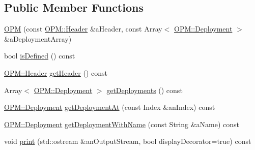 \subsection*{Public Member Functions}
\begin{DoxyCompactItemize}
\item 
\hyperlink{classostk_1_1astro_1_1trajectory_1_1orbit_1_1messages_1_1spacex_1_1_o_p_m_a2c7d8dad60a7cabf0a3a24bae0972a89}{O\+PM} (const \hyperlink{structostk_1_1astro_1_1trajectory_1_1orbit_1_1messages_1_1spacex_1_1_o_p_m_1_1_header}{O\+P\+M\+::\+Header} \&a\+Header, const Array$<$ \hyperlink{structostk_1_1astro_1_1trajectory_1_1orbit_1_1messages_1_1spacex_1_1_o_p_m_1_1_deployment}{O\+P\+M\+::\+Deployment} $>$ \&a\+Deployment\+Array)
\item 
bool \hyperlink{classostk_1_1astro_1_1trajectory_1_1orbit_1_1messages_1_1spacex_1_1_o_p_m_ac3351273b45e39ef7574a5cb9b7bf30d}{is\+Defined} () const
\item 
\hyperlink{structostk_1_1astro_1_1trajectory_1_1orbit_1_1messages_1_1spacex_1_1_o_p_m_1_1_header}{O\+P\+M\+::\+Header} \hyperlink{classostk_1_1astro_1_1trajectory_1_1orbit_1_1messages_1_1spacex_1_1_o_p_m_ae0474132f01725d4b6e1276e52b9eb21}{get\+Header} () const
\item 
Array$<$ \hyperlink{structostk_1_1astro_1_1trajectory_1_1orbit_1_1messages_1_1spacex_1_1_o_p_m_1_1_deployment}{O\+P\+M\+::\+Deployment} $>$ \hyperlink{classostk_1_1astro_1_1trajectory_1_1orbit_1_1messages_1_1spacex_1_1_o_p_m_a61911a7200fc4b6c6b82224b3f8f07b6}{get\+Deployments} () const
\item 
\hyperlink{structostk_1_1astro_1_1trajectory_1_1orbit_1_1messages_1_1spacex_1_1_o_p_m_1_1_deployment}{O\+P\+M\+::\+Deployment} \hyperlink{classostk_1_1astro_1_1trajectory_1_1orbit_1_1messages_1_1spacex_1_1_o_p_m_a175c99608626161b9fccba5b82c55416}{get\+Deployment\+At} (const Index \&an\+Index) const
\item 
\hyperlink{structostk_1_1astro_1_1trajectory_1_1orbit_1_1messages_1_1spacex_1_1_o_p_m_1_1_deployment}{O\+P\+M\+::\+Deployment} \hyperlink{classostk_1_1astro_1_1trajectory_1_1orbit_1_1messages_1_1spacex_1_1_o_p_m_a9bad05972b0877708a32775690fe0f1e}{get\+Deployment\+With\+Name} (const String \&a\+Name) const
\item 
void \hyperlink{classostk_1_1astro_1_1trajectory_1_1orbit_1_1messages_1_1spacex_1_1_o_p_m_ae87eca86b432e8abd8137df02c1f9085}{print} (std\+::ostream \&an\+Output\+Stream, bool display\+Decorator=true) const
\end{DoxyCompactItemize}
